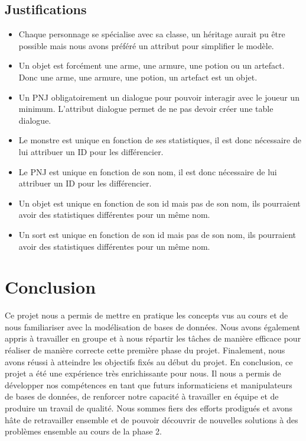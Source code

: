 \documentclass[utf8]{article}
\begin{document}
\subsection{Justifications}
\begin{itemize}
    \item Chaque personnage se spécialise avec sa classe, un héritage aurait pu être possible mais nous avons préféré un attribut pour simplifier le modèle.
    \item Un objet est forcément une arme, une armure, une potion ou un artefact. Donc une arme, une armure, une potion, un artefact est un objet.
    \item Un PNJ obligatoirement un dialogue pour pouvoir interagir avec le joueur un minimum. L'attribut dialogue permet de ne pas devoir créer une table dialogue.
    \item Le monstre est unique en fonction de ses statistiques, il est donc nécessaire de lui attribuer un ID pour les différencier.
    \item Le PNJ est unique en fonction de son nom, il est donc nécessaire de lui attribuer un ID pour les différencier.
    \item Un objet est unique en fonction de son id mais pas de son nom, ils pourraient avoir des statistiques différentes pour un même nom.
    \item Un sort est unique en fonction de son id mais pas de son nom, ils pourraient avoir des statistiques différentes pour un même nom.
\end{itemize}

\section{Conclusion}
Ce projet nous a permis de mettre en pratique les concepts vus au cours et de nous familiariser avec la modélisation de bases de données.
Nous avons également appris à travailler en groupe et à nous répartir les tâches de manière efficace pour réaliser de manière correcte cette première phase du projet.
Finalement, nous avons réussi à atteindre les objectifs fixés au début du projet.
En conclusion, ce projet a été une expérience très enrichissante pour nous. Il nous a permis de développer nos compétences 
en tant que futurs informaticiens et manipulateurs de bases de données, de renforcer notre capacité à travailler en équipe et de produire un travail
de qualité. Nous sommes fiers des efforts prodigués et avons hâte de retravailler ensemble et de pouvoir 
découvrir de nouvelles solutions à des problèmes ensemble au cours de la phase 2.
\end{document}
